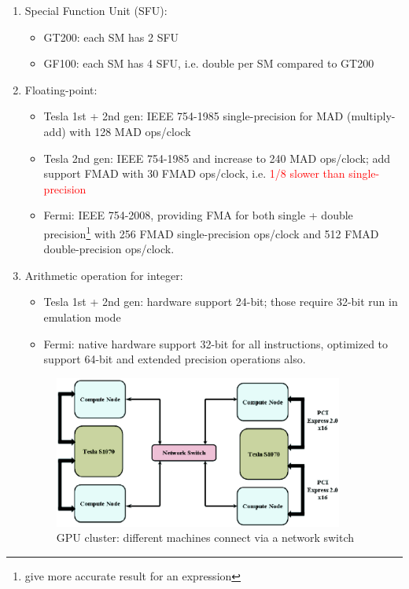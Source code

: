 \begin{enumerate}


\item Special Function Unit (SFU): 
  \begin{itemize}
  \item GT200: each SM has 2 SFU 
  \item GF100: each SM has 4 SFU, i.e. double per SM compared to GT200
  \end{itemize}

\item Floating-point:

  \begin{itemize}
  \item Tesla 1st + 2nd gen: IEEE 754-1985 single-precision for MAD
    (multiply-add) with 128 MAD ops/clock
  \item Tesla 2nd gen: IEEE 754-1985 and increase to 240 MAD
    ops/clock; add support FMAD with 30 FMAD ops/clock,
    i.e. \textcolor{red}{1/8 slower than single-precision}
  \item Fermi: IEEE 754-2008, providing FMA for both single +
    double
    precision\footnote{give more accurate result for an expression}
    with 256 FMAD single-precision ops/clock and 512 FMAD
    double-precision ops/clock.
  \end{itemize}

\item Arithmetic operation for integer:
  \begin{itemize}
  \item Tesla 1st + 2nd gen: hardware support 24-bit; those require
    32-bit run in emulation mode
  \item Fermi: native hardware support 32-bit for all instructions,
    optimized to support 64-bit and extended precision operations
    also.
  \end{itemize}
\begin{figure}[hbt]
  \centerline{\includegraphics[height=5cm,
    angle=0]{./images/tesla_cluster.eps}}
\caption{GPU cluster: different machines connect via a network switch}
\label{fig:tesla_cluster}
\end{figure}


\end{enumerate}
